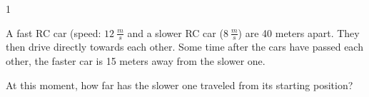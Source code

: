 
\AddToShipoutPicture*{\BackgroundPic}

\addtocounter {ProbNum} {1}

 
{\bf \Large{}} A fast RC car (speed: ${12~\tfrac{m}{s}}$ and a slower RC car (${8~\tfrac{m}{s}}$) are 40 meters apart. They then drive directly towards each other.  Some time after the cars have passed each other, the faster car is 15 meters away from the slower one.  

\bigskip

At this moment, how far has the slower one traveled from its starting position? 


\vfill

\newpage
